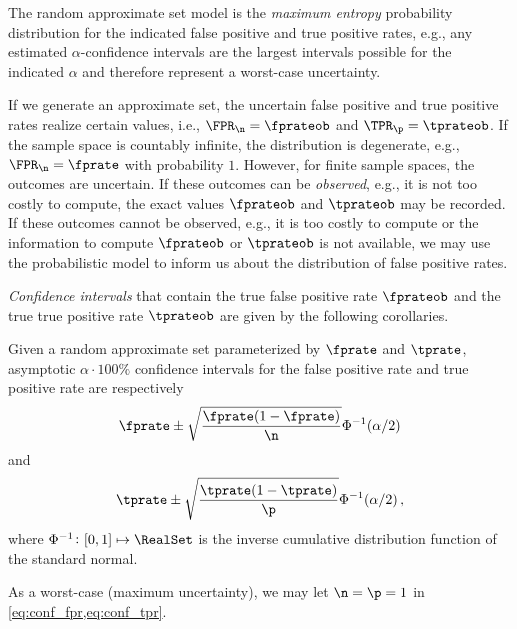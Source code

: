 \documentclass[ ../main.tex]{subfiles}
\begin{document}
The random approximate set model is the \emph{maximum entropy} probability distribution for the indicated false positive and true positive rates, e.g., any estimated $\alpha$-confidence intervals are the largest intervals possible for the indicated $\alpha$ and therefore represent a worst-case uncertainty.

If we generate an approximate set, the uncertain false positive and true positive rates realize certain values, i.e., $\FPR_\n = \fprateob$ and $\TPR_\p = \tprateob$.
If the sample space is countably infinite, the distribution is degenerate, e.g., $\FPR_\n = \fprate$ with probability $1$. 
However, for finite sample spaces, the outcomes are uncertain.
If these outcomes can be \emph{observed}, e.g., it is not too costly to compute, the exact values $\fprateob$ and $\tprateob$ may be recorded.
If these outcomes cannot be observed, e.g., it is too costly to compute or the information to compute $\fprateob$ or $\tprateob$ is not available, we may use the probabilistic model to inform us about the distribution of false positive rates.

\emph{Confidence intervals} that contain the true false positive rate $\fprateob$ and the true true positive rate $\tprateob$ are given by the following corollaries.
\begin{theorem}
    Given a random approximate set parameterized by $\fprate$ and $\tprate$, asymptotic $\alpha \cdot 100\%$ confidence intervals for the false positive rate and true positive rate are respectively
    \begin{equation}
    \label{eq:conf_fpr}
    \fprate \pm \sqrt{\frac{\fprate(1-\fprate)}{\n}} \Phi^{-1}(\alpha/2)
    \end{equation}
    and
    \begin{equation}
    \label{eq:conf_tpr}
    \tprate \pm \sqrt{\frac{\tprate(1-\tprate)}{\p}} \Phi^{-1}(\alpha/2)\,,
    \end{equation}
    where $\Phi^{-1} \colon [0,1] \mapsto \RealSet$ is the inverse cumulative distribution function of the standard normal.
\end{theorem}
As a worst-case (maximum uncertainty), we may let $\n = \p = 1$ in \cref{eq:conf_fpr,eq:conf_tpr}.
\end{document}

